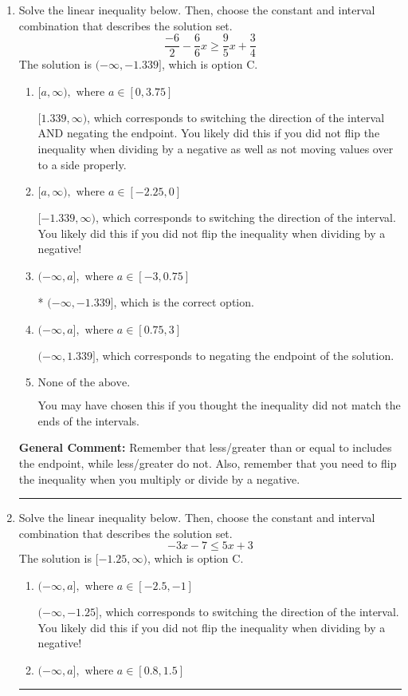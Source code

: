 \documentclass{extbook}[14pt]
\newcommand{\litem}[1]{\item #1

\rule{\textwidth}{0.4pt}}
\begin{document}
\begin{enumerate}\litem{
Solve the linear inequality below. Then, choose the constant and interval combination that describes the solution set.
\[ \frac{-6}{2} - \frac{6}{6} x \geq \frac{9}{5} x + \frac{3}{4} \]The solution is \( (-\infty, -1.339] \), which is option C.\begin{enumerate}[label=\Alph*.]
\item \( [a, \infty), \text{ where } a \in [0, 3.75] \)

 $[1.339, \infty)$, which corresponds to switching the direction of the interval AND negating the endpoint. You likely did this if you did not flip the inequality when dividing by a negative as well as not moving values over to a side properly.
\item \( [a, \infty), \text{ where } a \in [-2.25, 0] \)

 $[-1.339, \infty)$, which corresponds to switching the direction of the interval. You likely did this if you did not flip the inequality when dividing by a negative!
\item \( (-\infty, a], \text{ where } a \in [-3, 0.75] \)

* $(-\infty, -1.339]$, which is the correct option.
\item \( (-\infty, a], \text{ where } a \in [0.75, 3] \)

 $(-\infty, 1.339]$, which corresponds to negating the endpoint of the solution.
\item \( \text{None of the above}. \)

You may have chosen this if you thought the inequality did not match the ends of the intervals.
\end{enumerate}

\textbf{General Comment:} Remember that less/greater than or equal to includes the endpoint, while less/greater do not. Also, remember that you need to flip the inequality when you multiply or divide by a negative.
}
\litem{
Solve the linear inequality below. Then, choose the constant and interval combination that describes the solution set.
\[ -3x -7 \leq 5x + 3 \]The solution is \( [-1.25, \infty) \), which is option C.\begin{enumerate}[label=\Alph*.]
\item \( (-\infty, a], \text{ where } a \in [-2.5, -1] \)

 $(-\infty, -1.25]$, which corresponds to switching the direction of the interval. You likely did this if you did not flip the inequality when dividing by a negative!
\item \( (-\infty, a], \text{ where } a \in [0.8, 1.5] \)


\end{enumerate}}
\end{enumerate}
\end{document}

